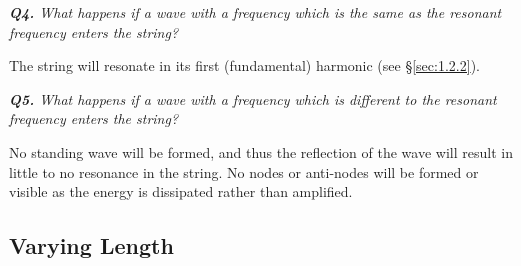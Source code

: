 \documentclass[12pt]{article}
\begin{document}
\textit{\textbf{Q4.} What happens if a wave with a frequency which is the same as the resonant frequency enters the string?}

The string will resonate in its first (fundamental) harmonic (see §\ref{sec:1.2.2}).

\textit{\textbf{Q5.} What happens if a wave with a frequency which is different to the resonant frequency enters the string?}

No standing wave will be formed, and thus the reflection of the wave will result in little to no resonance in the string. No nodes or anti-nodes will be formed or visible as the energy is dissipated rather than amplified.

\subsection{Varying Length}
\end{document}
